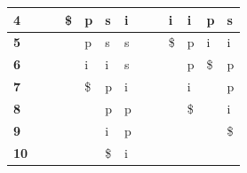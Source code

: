\begin{table}[h]
\begin{tabular}{|l|l|l|l|l|l|l|l|l|l|l|l|l|}
\textbf{4}                                                       &                         &                         & \$                      & p                      & s                      & i                      &                        &                        & i                      & i                      & p                       & s                       \\ \hline
\textbf{5}                                                       &                         &                         &                        & p                      & s                      & s                      &                        &                        & \$                      & p                      & i                       & i                       \\ \hline
\textbf{6}                                                       &                         &                         &                        & i                      & i                      & s                      &                        &                        &                        & p                      & \$                       & p                       \\ \hline
\textbf{7}                                                       &                         &                         &                        & \$                      & p                      & i                      &                        &                        &                        & i                      &                         & p                       \\ \hline
\textbf{8}                                                       &                         &                         &                        &                        & p                      & p                      &                        &                        &                        & \$                      &                         & i                       \\ \hline
\textbf{9}                                                       &                         &                         &                        &                        & i                      & p                      &                        &                        &                        &                        &                         & \$                       \\ \hline
\textbf{10}                                                      &                         &                         &                        &                        & \$                      & i                      &                        &                        &                        &                        &                         &                         \\ \hline

\end{tabular}
\end{table}
